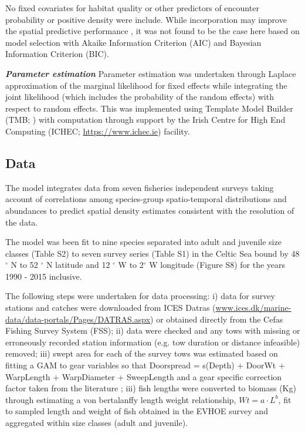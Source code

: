 \documentclass{nature}
\begin{document}
\begin{linenumbers}
No fixed covariates for habitat quality or other predictors of encounter
probability or positive density were include. While incorporation may improve
the spatial predictive performance \cite{Thorson2017}, it was not found to be
the case here based on model selection with Akaike Information Criterion (AIC)
and Bayesian Information Criterion (BIC).

\textbf{\textit{Parameter estimation}} Parameter estimation was undertaken
through Laplace approximation of the marginal likelihood for fixed effects
while integrating the joint likelihood (which includes the probability of the
random effects) with respect to random effects. This was implemented using
Template Model Builder (TMB; \cite{Kristensen2015}) with computation through
support by the Irish Centre for High End Computing (ICHEC;
\url{https://www.ichec.ie}) facility.  

\subsection{Data}

The model integrates data from seven fisheries independent surveys taking
account of correlations among species-group spatio-temporal distributions and
abundances to predict spatial density estimates consistent with the resolution
of the data. 

The model was been fit to nine species separated into adult and juvenile size
classes (Table S2) to seven survey series (Table S1) in the Celtic Sea bound by
48$^{\circ}$ N to 52 $^{\circ}$ N latitude and 12 $^{\circ}$ W to 2$^{\circ}$ W
longitude (Figure S8) for the years 1990 - 2015 inclusive. 

The following steps were undertaken for data processing: i) data for survey
stations and catches were downloaded from ICES Datras
(\url{www.ices.dk/marine-data/data-portals/Pages/DATRAS.aspx}) or obtained
directly from the Cefas Fishing Survey System (FSS); ii) data were checked and
any tows with missing or erroneously recorded station information (e.g. tow
duration or distance infeasible) removed; iii) swept area for each of the
survey tows was estimated based on fitting a GAM to gear variables so that
Doorspread = s(Depth) + DoorWt + WarpLength + WarpDiameter + SweepLength and a
gear specific correction factor taken from the literature \cite{Piet2009}; iii)
fish lengths were converted to biomass (Kg) through estimating a von
bertalanffy length weight relationship, $Wt = a \cdot L^{b}$, fit to sampled
length and weight of fish obtained in the EVHOE survey and aggregated within
size classes (adult and juvenile). 


\end{linenumbers}
\end{document}
